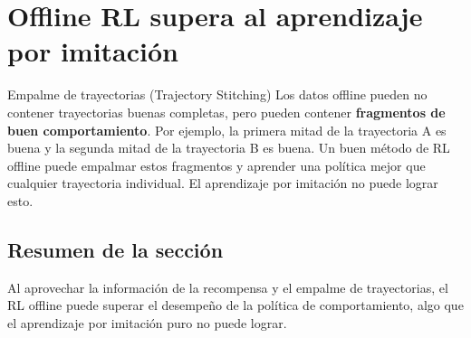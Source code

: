 \section{Offline RL supera al aprendizaje por imitación}

\begin{importantbox}{Empalme de trayectorias (Trajectory Stitching)}
Los datos offline pueden no contener trayectorias buenas completas, pero pueden contener \textbf{fragmentos de buen comportamiento}. Por ejemplo, la primera mitad de la trayectoria A es buena y la segunda mitad de la trayectoria B es buena. Un buen método de RL offline puede empalmar estos fragmentos y aprender una política mejor que cualquier trayectoria individual. El aprendizaje por imitación no puede lograr esto.
\end{importantbox}

\subsection{Resumen de la sección}

Al aprovechar la información de la recompensa y el empalme de trayectorias, el RL offline puede superar el desempeño de la política de comportamiento, algo que el aprendizaje por imitación puro no puede lograr.

